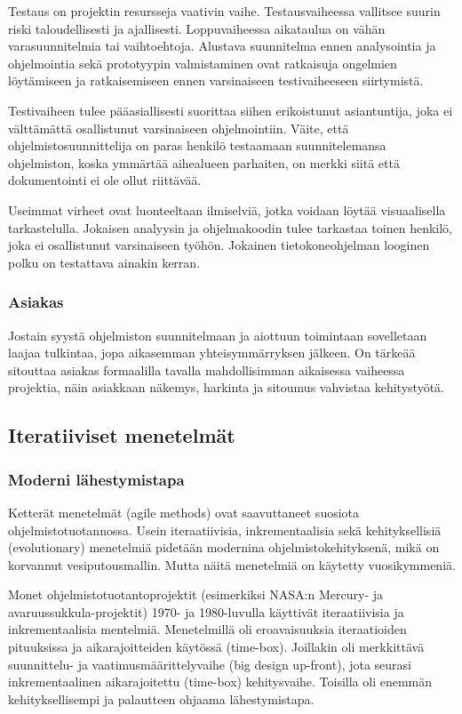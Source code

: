 \documentclass[finnish]{tktltiki2}
\theoremstyle{definition}
\theoremstyle{remark}
\begin{document}
Testaus on projektin resursseja vaativin vaihe. Testausvaiheessa vallitsee suurin riski taloudellisesti ja ajallisesti. Loppuvaiheessa aikataulua on vähän varasuunnitelmia tai vaihtoehtoja. Alustava suunnitelma ennen analysointia ja ohjelmointia sekä prototyypin valmistaminen ovat ratkaisuja ongelmien löytämiseen ja ratkaisemiseen ennen varsinaiseen testivaiheeseen siirtymistä.\cite{ROY70}

Testivaiheen tulee pääasiallisesti suorittaa siihen erikoistunut asiantuntija, joka ei välttämättä osallistunut varsinaiseen ohjelmointiin. Väite, että ohjelmistosuunnittelija on paras henkilö      
testaamaan suunnitelemansa ohjelmiston, koska ymmärtää aihealueen parhaiten, on merkki siitä että dokumentointi ei ole ollut riittävää.\cite{ROY70} 

Useimmat virheet ovat luonteeltaan ilmiselviä, jotka voidaan löytää visuaalisella tarkastelulla. Jokaisen analyysin ja ohjelmakoodin tulee tarkastaa toinen henkilö, joka ei osallistunut varsinaiseen työhön. Jokainen tietokoneohjelman looginen polku on testattava ainakin kerran.\cite{ROY70}
 
\subsubsection{Asiakas}

Jostain syystä ohjelmiston suunnitelmaan ja aiottuun toimintaan sovelletaan laajaa tulkintaa, jopa aikasemman yhteisymmärryksen jälkeen. On tärkeää sitouttaa asiakas formaalilla tavalla mahdollisimman aikaisessa vaiheessa projektia, näin asiakkaan näkemys, harkinta ja sitoumus vahvistaa kehitystyötä.\cite{ROY70} 	  


\subsection{Iteratiiviset menetelmät}

\subsubsection{Moderni lähestymistapa}

Ketterät menetelmät (agile methods) ovat saavuttaneet suosiota ohjelmistotuotannossa. Usein iteraatiivisia, inkrementaalisia sekä kehityksellisiä (evolutionary) menetelmiä pidetään modernina ohjelmistokehityksenä, mikä on korvannut vesiputousmallin. Mutta näitä menetelmiä on käytetty vuosikymmeniä.\cite{LAB03}

Monet ohjelmistotuotantoprojektit  (esimerkiksi NASA:n Mercury- ja avaruussukkula-projektit) 1970- ja 1980-luvulla käyttivät iteraatiivisia ja inkrementaalisia mentelmiä.  Menetelmillä oli eroavaisuuksia iteraatioiden pituuksissa ja aikarajoitteiden käytössä (time-box). Joillakin oli merkkittävä suunnittelu- ja vaatimusmäärittelyvaihe (big design up-front), jota seurasi inkrementaalinen aikarajoitettu (time-box) kehitysvaihe. Toisilla oli enemmän kehityksellisempi ja palautteen ohjaama lähestymistapa.\cite{LAB03}
\end{document}

